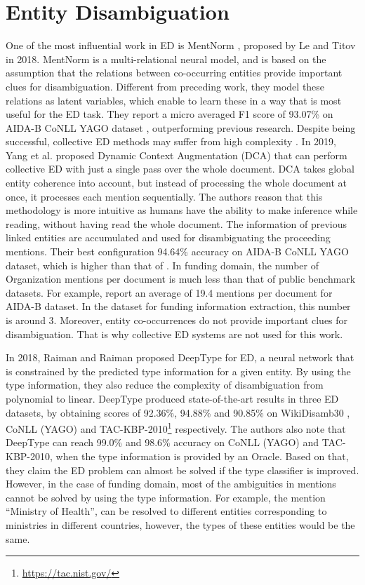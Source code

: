 \documentclass{report}
\theoremstyle{definition}
\theoremstyle{remark}
\begin{document}
\section{Entity Disambiguation}
\label{sota2}

One of the most influential work in ED is MentNorm \cite{mentnorm}, proposed by Le and Titov in 2018. MentNorm is a multi-relational neural model, and is based on the assumption that the relations between co-occurring entities provide important clues for disambiguation. Different from preceding work, they model these relations as latent variables, which enable to learn these in a way that is most useful for the ED task. They report a micro averaged F1 score of 93.07\% on AIDA-B CoNLL YAGO dataset \cite{CoNLLYago}, outperforming previous research. Despite being successful, collective ED methods may suffer from high complexity \cite{dca}. In 2019, Yang et al. \cite{dca} proposed Dynamic Context Augmentation (DCA) that can perform collective ED with just a single pass over the whole document. DCA takes global entity coherence into account, but instead of processing the whole document at once, it processes each mention sequentially. The authors reason that this methodology is more intuitive as humans have the ability to make inference while reading, without having read the whole document. The information of previous linked entities are accumulated and used for disambiguating the proceeding mentions. Their best configuration 94.64\% accuracy on AIDA-B CoNLL YAGO dataset, which is higher than that of \cite{mentnorm}. In funding domain, the number of Organization mentions per document is much less than that of public benchmark datasets. For example, \cite{dca} report an average of 19.4 mentions per document for AIDA-B dataset. In the dataset for funding information extraction, this number is around 3. Moreover, entity co-occurrences do not provide important clues for disambiguation. That is why collective ED systems are not used for this work.

In 2018, Raiman and Raiman proposed DeepType \cite{raiman} for ED, a neural network that is constrained by the predicted type information for a given entity. By using the type information, they also reduce the complexity of disambiguation from polynomial to linear. DeepType produced state-of-the-art results in three ED datasets, by obtaining scores of 92.36\%, 94.88\% and 90.85\% on WikiDisamb30 \cite{wikidisamb}, CoNLL (YAGO) \cite{CoNLLYago} and TAC-KBP-2010\footnote{\url{https://tac.nist.gov/}} respectively. The authors also note that DeepType can reach 99.0\% and 98.6\% accuracy on CoNLL (YAGO) and TAC-KBP-2010, when the type information is provided by an Oracle. Based on that, they claim the ED problem can almost be solved if the type classifier is improved. However, in the case of funding domain, most of the ambiguities in mentions cannot be solved by using the type information. For example, the mention ``Ministry of Health'', can be resolved to different entities corresponding to ministries in different countries, however,  the types of these entities would be the same.
\end{document}
